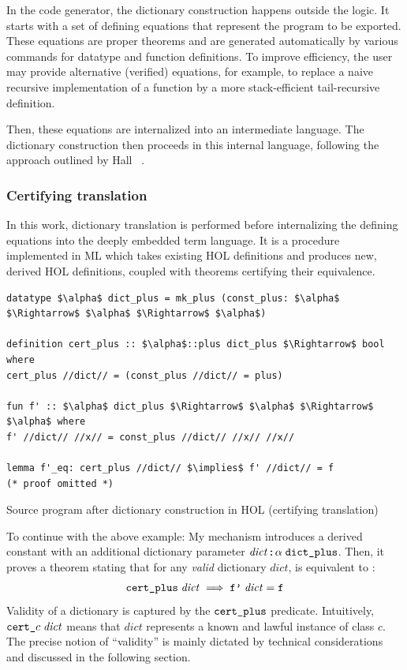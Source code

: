 In the code generator, the dictionary construction happens outside the logic.
It starts with a set of defining equations that represent the program to be exported.
These equations are proper theorems and are generated automatically by various commands for datatype and function definitions.
To improve efficiency, the user may provide alternative (verified) equations, for example, to replace a naive recursive implementation of a function by a more stack-efficient tail-recursive definition.

Then, these equations are internalized into an intermediate language.
The dictionary construction then proceeds in this internal language, following the approach outlined by Hall \etal~\cite{hall1996classes}.

\subsubsection{Certifying translation}
\label{sec:preproc:dict:elim:cert}

In this work, dictionary translation is performed before internalizing the defining equations into the deeply embedded term language.
It is a procedure implemented in ML which takes existing HOL definitions and produces new, derived HOL definitions, coupled with theorems certifying their equivalence.

\begin{code}
  \begin{lstlisting}[language=Isabelle]
datatype $\alpha$ dict_plus = mk_plus (const_plus: $\alpha$ $\Rightarrow$ $\alpha$ $\Rightarrow$ $\alpha$)

definition cert_plus :: $\alpha$::plus dict_plus $\Rightarrow$ bool where
cert_plus //dict// = (const_plus //dict// = plus)

fun f' :: $\alpha$ dict_plus $\Rightarrow$ $\alpha$ $\Rightarrow$ $\alpha$ where
f' //dict// //x// = const_plus //dict// //x// //x//

lemma f'_eq: cert_plus //dict// $\implies$ f' //dict// = f
(* proof omitted *)
  \end{lstlisting}
  \caption{Source program after dictionary construction in HOL (certifying translation)}
  \label{code:preproc:dict:hol}
\end{code}

To continue with the above example:
My mechanism introduces a derived constant  with an additional dictionary parameter $\mathit{dict} \mathbin{:\!\!:} \alpha\;\texttt{\textup{dict\_plus}}$.
Then, it proves a theorem stating that for any \emph{valid} dictionary $\mathit{dict}$,  is equivalent to :
\[ \texttt{\textup{cert\_plus}}\;\mathit{dict} \implies \texttt{\textup{f'}}\;\mathit{dict} = \texttt{\textup{f}} \]
Validity of a dictionary is captured by the $\texttt{\textup{cert\_plus}}$ predicate.
Intuitively, $\texttt{\textup{cert\_}}c\;\mathit{dict}$ means that $\mathit{dict}$ represents a known and lawful instance of class $c$.
The precise notion of ``validity'' is mainly dictated by technical considerations and discussed in the following section.

